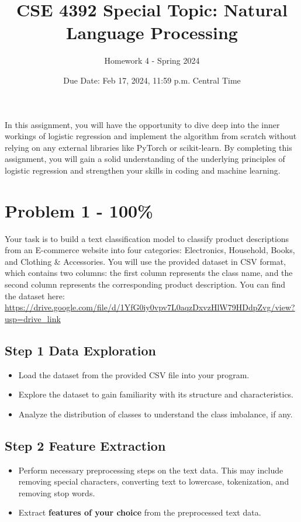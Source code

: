\documentclass{article}
\begin{document}
\title{CSE 4392 Special Topic: Natural Language Processing}
\author{Homework 4 - Spring 2024}
\date{Due Date: Feb 17, 2024, 11:59 p.m. Central Time}
\maketitle
\thispagestyle{fancy}


In this assignment, you will have the opportunity to dive deep into the inner workings of logistic regression and implement the algorithm from scratch without relying on any external libraries like PyTorch or scikit-learn.
By completing this assignment, you will gain a solid understanding of the underlying principles of logistic regression and strengthen your skills in coding and machine learning.

\section*{Problem 1 - 100\%}
Your task is to build a text classification model to classify product descriptions from an E-commerce website into four categories: Electronics, Household, Books, and Clothing \& Accessories. 
You will use the provided dataset in CSV format, which contains two columns: the first column represents the class name, and the second column represents the corresponding product description.
You can find the dataset here: \url{https://drive.google.com/file/d/1YfG0iy0vpv7L0aqzDxvzHlW79HDdpZvg/view?usp=drive_link}

\subsection*{Step 1 Data Exploration}
\begin{itemize}
    \item Load the dataset from the provided CSV file into your program.
    \item Explore the dataset to gain familiarity with its structure and characteristics.
    \item Analyze the distribution of classes to understand the class imbalance, if any.
\end{itemize}

\subsection*{Step 2 Feature Extraction}
\begin{itemize}
    \item Perform necessary preprocessing steps on the text data. This may include removing special characters, converting text to lowercase, tokenization, and removing stop words.
    \item Extract \textbf{features of your choice} from the preprocessed text 
data.
\end{itemize}
\end{document}
